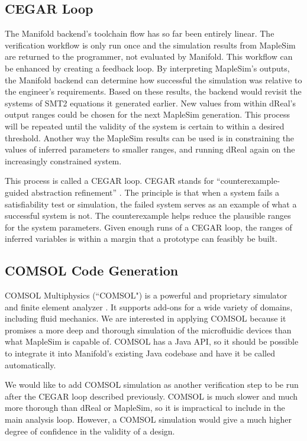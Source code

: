 \subsection{CEGAR Loop}

The Manifold backend's toolchain flow has so far been entirely linear.
The verification workflow is only run once and the simulation results from MapleSim are returned
to the programmer, not evaluated by Manifold. This workflow can be enhanced by creating a feedback
loop.
By interpreting MapleSim's outputs, the Manifold backend can determine how successful the simulation was
relative to the engineer's requirements.
Based on these results, the backend would revisit the systems of SMT2 equations it generated earlier.
New values from within dReal's output ranges could be chosen for the next MapleSim generation.
This process will be repeated until the validity of the system is certain to within a desired threshold.
Another way the MapleSim results can be used is in constraining the values of inferred parameters to
smaller ranges, and running dReal again on the increasingly constrained system.

This process is called a CEGAR loop. CEGAR stands for ``counterexample-guided abstraction refinement'' \cite
{cegar}.
The principle is that when a system fails a satisfiability test or simulation, the failed system
serves as an example of what a successful system is not.
The counterexample helps reduce the plausible ranges for the system parameters.
Given enough runs of a CEGAR loop, the ranges of inferred variables is within a margin that a prototype
can feasibly be built.

\subsection{COMSOL Code Generation}

COMSOL Multiphysics (``COMSOL") \cite{comsol} is a powerful and proprietary simulator and finite element analyzer \cite{fem}.
It supports add-ons for a wide variety of domains, including fluid mechanics.
We are interested in applying COMSOL because it promises a more deep and thorough simulation of the microfluidic devices than what MapleSim is capable of.
COMSOL has a Java API, so it should be possible to integrate it into Manifold's existing Java codebase and have it be called automatically.

We would like to add COMSOL simulation as another verification step to be run after the CEGAR
loop described previously.
COMSOL is much slower and much more thorough than dReal or MapleSim, so it is impractical to include
in the main analysis loop. However, a COMSOL simulation would give a much higher degree of confidence in the
validity of a design.
